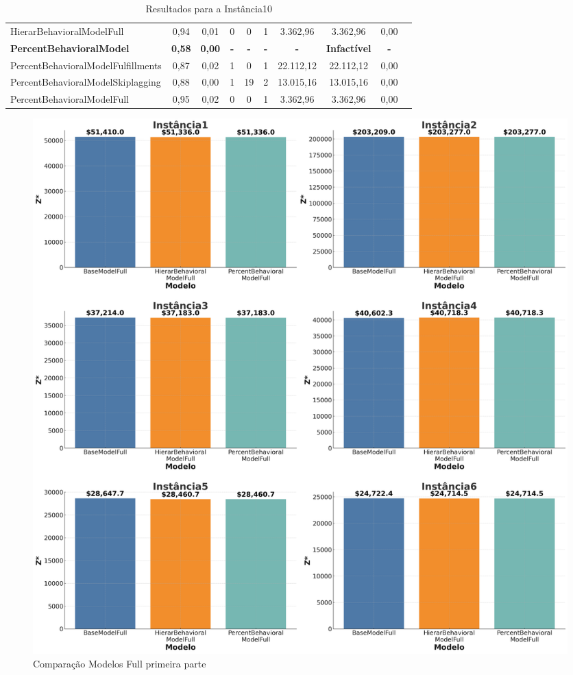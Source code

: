 \begin{table}[H]
{\begin{tabular}{lccccccccc}
            HierarBehavioralModelFull & 0,94 & 0,01 & 0 & 0 & 1 & 3.362,96 & 3.362,96 & 0,00 \\
            \textbf{PercentBehavioralModel} & \textbf{0,58} & \textbf{0,00} & \textbf{-} & \textbf{-} & \textbf{-} & \textbf{- }& \textbf{Infactível} & \textbf{- }\\
            PercentBehavioralModelFulfillments & 0,87 & 0,02 & 1 & 0 & 1 & 22.112,12 & 22.112,12 & 0,00 \\
            PercentBehavioralModelSkiplagging & 0,88 & 0,00 & 1 & 19 & 2 & 13.015,16 & 13.015,16 & 0,00 \\
            PercentBehavioralModelFull & 0,95 & 0,02 & 0 & 0 & 1 & 3.362,96 & 3.362,96 & 0,00 \\ \hline
        \end{tabular}%
    }
    \caption{Resultados para a Instância10}
    \label{tab:resultado_instancia10}
\end{table}


\begin{figure}[!ht]
	\begin{center}
		\includegraphics[scale=0.28]{img/compFull1.png}
		\caption{Comparação Modelos Full primeira parte}
		\label{fig: compfull1}
	\end{center}
\end{figure}

